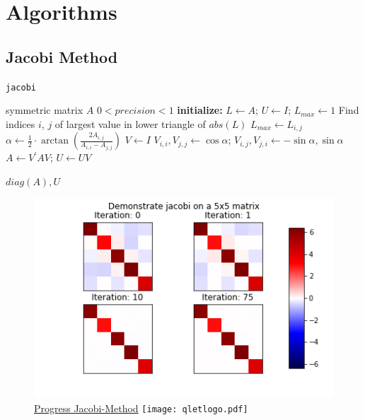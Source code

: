 \documentclass[12pt]{article}
\begin{document}
\section{Algorithms}
\subsection{Jacobi Method}


\begin{algorithm}[H]
\caption{\texttt{jacobi}}
\label{j-algo}
\begin{algorithmic}
  \Require symmetric matrix $A$
  \Ensure $0 < precision < 1$
  \Statex \textbf{initialize: } $L \gets A$; $U \gets I$; $L_{max} \gets 1$
    \State Find indices $i$, $j$ of largest value in lower triangle of $abs(L)$
        \State $L_{max} \gets L_{i,j}$
            \State $\alpha \gets \frac{1}{2}\cdot \arctan(\frac{2A_{i, j}}{A_{i, i}-A_{j, j}})$
    \State $V \gets I$
    \State $V_{i, i}, V_{j, j} \gets \cos \alpha$; $V_{i, j}, V_{j, i} \gets -\sin \alpha, \sin \alpha$
    \State $A \gets V^{\prime} A V$; $U \gets UV$

  \EndWhile
  \Return $diag(A), U$
\end{algorithmic}
\end{algorithm}


\begin{figure}
\begin{center}
\caption{\href {https://github.com/thsis/NIS18/tree/master/media/plots}{Progress Jacobi-Method}  \protect\texttt{[image: qletlogo.pdf]}}
  \includegraphics[scale=0.6]{../media/plots/jacobi.png}
\end{center}
\end{figure}
\end{document}
